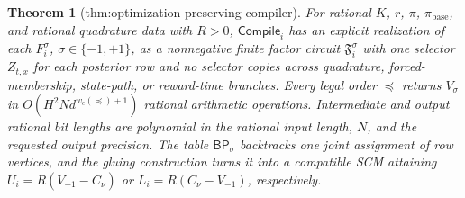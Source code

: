 \documentclass{article}
\newtheorem{theorem}{Theorem}
\begin{document}
\begin{theorem}[thm:optimization-preserving-compiler]\label{thm:optimization-preserving-compiler}
For rational \(K\), \(r\), \(\pi\), \(\pi_{\mathrm{base}}\), and rational quadrature data with \(R>0\), \(\mathsf{Compile}_i\) has an explicit realization of each \(F_i^\sigma\), \(\sigma\in\{-1,+1\}\), as a nonnegative finite factor circuit \(\mathfrak F_i^\sigma\) with one selector \(Z_{t,x}\) for each posterior row and no selector copies across quadrature, forced-membership, state-path, or reward-time branches.  Every legal order \(\preceq\) returns \(V_\sigma\) in \(O(H^2N d^{w_{\mathrm c}(\preceq)+1})\) rational arithmetic operations.  Intermediate and output rational bit lengths are polynomial in the rational input length, \(N\), and the requested output precision.  The table \(\mathsf{BP}_\sigma\) backtracks one joint assignment of row vertices, and the gluing construction turns it into a compatible SCM attaining \(U_i=R(V_{+1}-C_\nu)\) or \(L_i=R(C_\nu-V_{-1})\), respectively.
\end{theorem}
\end{document}
